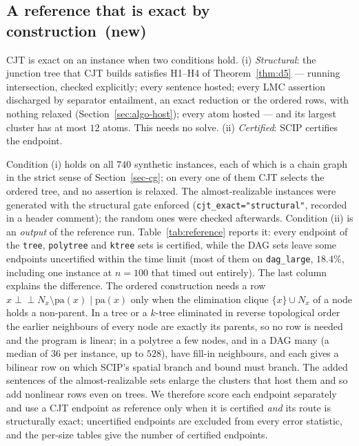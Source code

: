 \documentclass{article} %
\DeclareRobustCommand{\rev}[1]{{\color{blue}#1}}
\newcommand{\newtag}{\texorpdfstring{~\rev{(new)}}{}}
\newcommand{\indep}{\perp\!\!\!\perp}
\newcommand{\pa}{\mathrm{pa}}
\begin{document}
\subsection{A reference that is exact by construction\newtag}
\label{sec-cjt-gate}

CJT is exact on an instance when two conditions hold. (i) \emph{Structural}: the junction tree that CJT builds satisfies H1--H4 of Theorem~\ref{thm:d5} --- running intersection, checked explicitly; every sentence hosted; every LMC assertion discharged by separator entailment, an exact reduction or the ordered rows, with nothing relaxed (Section~\ref{sec:algo-host}); every atom hosted --- and its largest cluster has at most $12$ atoms. This needs no solve. (ii) \emph{Certified}: SCIP certifies the endpoint.

Condition (i) holds on all $740$ synthetic instances, each of which is a chain graph in the strict sense of Section~\ref{sec-cg}; on every one of them CJT selects the ordered tree, and no assertion is relaxed. The almost-realizable instances were generated with the structural gate enforced (\texttt{cjt\_exact="structural"}, recorded in a header comment); the random ones were checked afterwards. Condition (ii) is an \emph{output} of the reference run. Table~\ref{tab:reference} reports it: every endpoint of the \texttt{tree}, \texttt{polytree} and \texttt{ktree} sets is certified, while the DAG sets leave some endpoints uncertified within the time limit (most of them on \texttt{dag\_large}, $18.4\%$, including one instance at $n=100$ that timed out entirely). The last column explains the difference. The ordered construction needs a row $x\indep N_x\setminus\pa(x)\mid\pa(x)$ only when the elimination clique $\{x\}\cup N_x$ of a node holds a non-parent. In a tree or a $k$-tree eliminated in reverse topological order the earlier neighbours of every node are exactly its parents, so no row is needed and the program is linear; in a polytree a few nodes, and in a DAG many (a median of $36$ per instance, up to $528$), have fill-in neighbours, and each gives a bilinear row on which SCIP's spatial branch and bound must branch. The added sentences of the almost-realizable sets enlarge the clusters that host them and so add nonlinear rows even on trees. We therefore score each endpoint separately and use a CJT endpoint as reference only when it is certified \emph{and} its route is structurally exact; uncertified endpoints are excluded from every error statistic, and the per-size tables give the number of certified endpoints.
\end{document}
